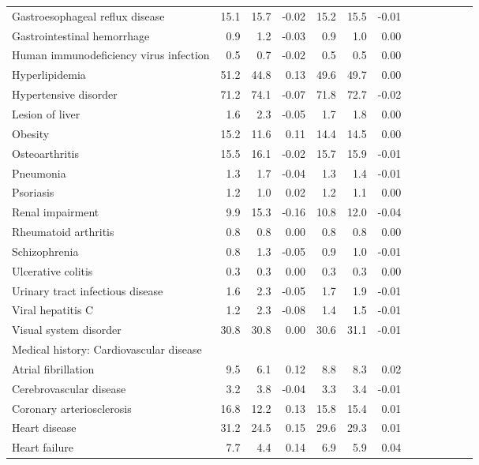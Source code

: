 \documentclass[11pt,]{article}
\begin{document}
\begin{longtable}{lrrrrrrrrrrrr}
      Gastroesophageal reflux disease & 15.1 & 15.7 & -0.02 & 15.2 & 15.5 & -0.01 \\ 
      Gastrointestinal hemorrhage &  0.9 &  1.2 & -0.03 &  0.9 &  1.0 &  0.00 \\ 
      Human immunodeficiency virus infection &  0.5 &  0.7 & -0.02 &  0.5 &  0.5 &  0.00 \\ 
      Hyperlipidemia & 51.2 & 44.8 &  0.13 & 49.6 & 49.7 &  0.00 \\ 
      Hypertensive disorder & 71.2 & 74.1 & -0.07 & 71.8 & 72.7 & -0.02 \\ 
      Lesion of liver &  1.6 &  2.3 & -0.05 &  1.7 &  1.8 &  0.00 \\ 
      Obesity & 15.2 & 11.6 &  0.11 & 14.4 & 14.5 &  0.00 \\ 
      Osteoarthritis & 15.5 & 16.1 & -0.02 & 15.7 & 15.9 & -0.01 \\ 
      Pneumonia &  1.3 &  1.7 & -0.04 &  1.3 &  1.4 & -0.01 \\ 
      Psoriasis &  1.2 &  1.0 &  0.02 &  1.2 &  1.1 &  0.00 \\ 
      Renal impairment &  9.9 & 15.3 & -0.16 & 10.8 & 12.0 & -0.04 \\ 
      Rheumatoid arthritis &  0.8 &  0.8 &  0.00 &  0.8 &  0.8 &  0.00 \\ 
      Schizophrenia &  0.8 &  1.3 & -0.05 &  0.9 &  1.0 & -0.01 \\ 
      Ulcerative colitis &  0.3 &  0.3 &  0.00 &  0.3 &  0.3 &  0.00 \\ 
      Urinary tract infectious disease &  1.6 &  2.3 & -0.05 &  1.7 &  1.9 & -0.01 \\ 
      Viral hepatitis C &  1.2 &  2.3 & -0.08 &  1.4 &  1.5 & -0.01 \\ 
      Visual system disorder & 30.8 & 30.8 &  0.00 & 30.6 & 31.1 & -0.01 \\ 
  Medical history: Cardiovascular disease &    &    &     &    &    &     \\ 
      Atrial fibrillation &  9.5 &  6.1 &  0.12 &  8.8 &  8.3 &  0.02 \\ 
      Cerebrovascular disease &  3.2 &  3.8 & -0.04 &  3.3 &  3.4 & -0.01 \\ 
      Coronary arteriosclerosis & 16.8 & 12.2 &  0.13 & 15.8 & 15.4 &  0.01 \\ 
      Heart disease & 31.2 & 24.5 &  0.15 & 29.6 & 29.3 &  0.01 \\ 
      Heart failure &  7.7 &  4.4 &  0.14 &  6.9 &  5.9 &  0.04 \\ 

\end{longtable}
\end{document}
